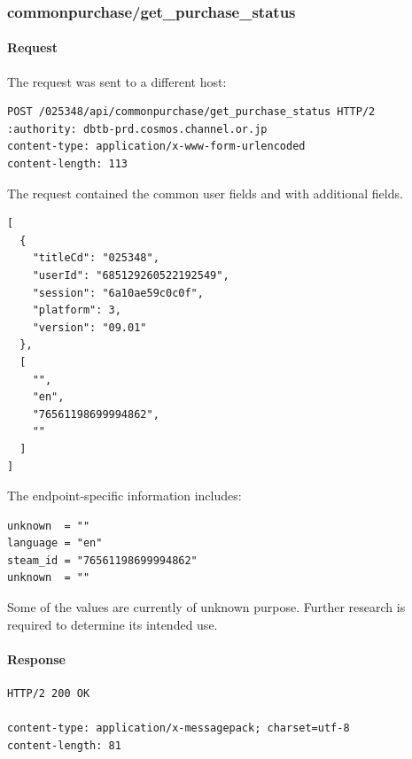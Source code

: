 \subsubsection{commonpurchase/get\_purchase\_status}
\label{subsec:api_commonpurchase_get_purchase_status}

\paragraph{Request}

The request was sent to a different host:

\begin{lstlisting}
POST /025348/api/commonpurchase/get_purchase_status HTTP/2
:authority: dbtb-prd.cosmos.channel.or.jp
content-type: application/x-www-form-urlencoded
content-length: 113
\end{lstlisting}

The request contained the common user fields and with additional fields.

\begin{lstlisting}
[
  {
    "titleCd": "025348",
    "userId": "685129260522192549",
    "session": "6a10ae59c0c0f",
    "platform": 3,
    "version": "09.01"
  },
  [
    "",
    "en",
    "76561198699994862",
    ""
  ]
]
\end{lstlisting}

The endpoint-specific information includes:

\begin{lstlisting}
unknown  = ""
language = "en"
steam_id = "76561198699994862"
unknown  = ""
\end{lstlisting}

\begin{tcolorbox}[colback=yellow!10,colframe=orange!80!black,title=Warning]
Some of the values are currently of unknown purpose.
Further research is required to determine its intended use.
\end{tcolorbox}

\newpage

\paragraph{Response}

\begin{lstlisting}
HTTP/2 200 OK

content-type: application/x-messagepack; charset=utf-8
content-length: 81
\end{lstlisting}

